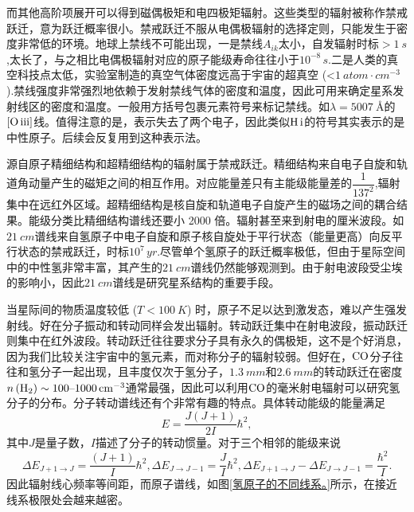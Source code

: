\documentclass[../天体物理基础.tex]{subfiles}
\begin{document}
而其他高阶项展开可以得到磁偶极矩和电四极矩辐射。这些类型的辐射被称作禁戒跃迁，意为跃迁概率很小。禁戒跃迁不服从电偶极辐射的选择定则，只能发生于密度非常低的环境。地球上禁线不可能出现，一是禁线$A_{ik}$太小，自发辐射时标$>\qty{1}{s}$,太长了，与之相比电偶极辐射对应的原子能级寿命往往小于$10^{-8}\,\unit{s}$.二是人类的真空科技点太低，实验室制造的真空气体密度远高于宇宙的超真空 (<$\qty{1}{atom\cdot cm^{-3}}$).禁线强度非常强烈地依赖于发射禁线气体的密度和温度，因此可用来确定星系发射线区的密度和温度。一般用方括号包裹元素符号来标记禁线。如$\lambda=\qty{5007}{\angstrom}$的$\left[\ce{O}\,\mathrm{\uppercase\expandafter{\romannumeral3}}\right]$线。值得注意的是，\uppercase\expandafter{}表示失去了两个电子，因此类似$\ce{H}\,\mathrm{\uppercase\expandafter{\romannumeral1}}$的符号其实表示的是中性原子。后续会反复用到这种表示法。

源自原子精细结构和超精细结构的辐射属于禁戒跃迁。精细结构来自电子自旋和轨道角动量产生的磁矩之间的相互作用。对应能量差只有主能级能量差的$\dfrac{1}{137^{2}}$,辐射集中在远红外区域。超精细结构是核自旋和轨道电子自旋产生的磁场之间的耦合结果。能级分类比精细结构谱线还要小 2000 倍。辐射甚至来到射电的厘米波段。如$\qty{21}{cm}$谱线来自氢原子中电子自旋和原子核自旋处于平行状态（能量更高）向反平行状态的禁戒跃迁，时标$10^{7}\,\unit{yr}$.尽管单个氢原子的跃迁概率极低，但由于星际空间中的中性氢非常丰富，其产生的$\qty{21}{cm}$谱线仍然能够观测到。由于射电波段受尘埃的影响小，因此$\qty{21}{cm}$谱线是研究星系结构的重要手段。

当星际间的物质温度较低 ($T<\qty{100}{K}$) 时，原子不足以达到激发态，难以产生强发射线。好在分子振动和转动同样会发出辐射。转动跃迁集中在射电波段，振动跃迁则集中在红外波段。转动跃迁往往要求分子具有永久的偶极矩，这不是个好消息，因为我们比较关注宇宙中的氢元素，而对称分子的辐射较弱。但好在，$\ce{CO}$分子往往和氢分子一起出现，且丰度仅次于氢分子，$\qty{1.3}{mm}$和$\qty{2.6}{mm}$的转动跃迁在密度$n\left(\ce{^{}H2}\right)\sim100\text{\textendash}1000\,\unit{cm^{-3}}$通常最强，因此可以利用$\ce{CO}$的毫米射电辐射可以研究氢分子的分布。分子转动谱线还有个非常有趣的特点。具体转动能级的能量满足
\begin{equation}
E=\frac{J(J+1)}{2I}\hbar^{2},
\end{equation}
其中$J$是量子数，$I$描述了分子的转动惯量。对于三个相邻的能级来说
\begin{equation}
\Delta{}E_{J+1\to J}=\frac{\left(J+1\right)}{I}\hbar^{2},\Delta{}E_{J\to J-1}=\frac{J}{I}\hbar^{2},\Delta{}E_{J+1\to J}-\Delta{}E_{J\to J-1}=\frac{\hbar^{2}}{I}.
\end{equation}
因此辐射线心频率等间距，而原子谱线，如图\ref{氢原子的不同线系。}所示，在接近线系极限处会越来越密。
\end{document}

